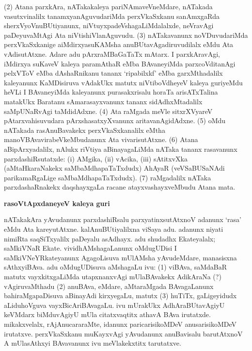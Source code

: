 (2) Atana parxkAra, nATakakaleya pariNAmaveVneMdare, nATakada vasutxvinalilx tanamxya\-nAguvudariMda perxVkaSxkanu sanAmxgaRda sherxVyoVnuBUtiyanunx, niVtuyxpadeVsha\-gaLiMdalalxde, neVravAgi paDeyuvaMtAgi Ata niVtishiVlanAguvudu. (3) nATakavanunx noVDuvuda\-riMda perxVkaSxkanige aiMdirxyasuKAMsha anuBUtavAgadiruvudilalx eMdu Ata vAdisu\-tAtxne. Adare adu pArxraMBaGaTaTx mAtarx. I parxkAravAgi, iMdirxya suKaveV kaleya paramAthaR eMba BAvaneyiMda parxcoVditanAgi pelxVToV eMba dAshaRnikanu tananx `ripabilxkf' eMba garxMthadalilx kaleyanunx KaMDisiruva vAdakUkx matutx niVtiboVdheyeV kaleya guriyeMdu heVLi I BAvaneyiMda kaleyanunx purasakxrisalu horaTa arisATxTa\-lina matakUkx Baratanu sAmarasayxvanunx tananx sidAdhxMtadalilx saMpUNaRvAgi taMdidAdxne. (4) Ata raMgada meVle sitxrXVyareV pAtarxvahisuvudara pArxshasatxyXvanunx aritavanAgidAdxne. (5) oMdu nATakada rasAnuBavakekx perxVkaSxkanalilx eMtha manoVBAvavirabeVkeMbu\-danunx Ata vivarisutAtxne. (6) Atana aBipArxyadalilx, nAlukx riVtiya aBinayagaLiMda nATaka tananx rasavanunx parxdashiRsutatxde: {\rm(i)} AMgika, {\rm(ii)} vAcika, {\rm(iii)} sAtitxvXka (aMtaHkaraNakekx saMbaMdhapaTaTxdudx) AhAyaR (veVSaBUSaNAdi parikamaRgaLige saMbaMdhapaTaTxdudx). (7) raMgadalilx nATaka parxdashaRnakekx daqshayxgaLa racane atayxvashayxveMbudu Atana mata.

\smallskip
\begin{center}
{\Large\bf rasoVtApxdaneyeV kaleya guri}
\end{center}

nATakakAra yAvudanunx parxdashiRsalu parxyatinxsutAtxnoV adanunx `rasa' eMdu Ata kareyutAtxne. kalAnuBUtiyalilxna viSaya adu. adanunx niyati nimiRta saqSiTxyalilx paDeyalu asAdhayx. adu shudadhx Ekateyalalx; saMkiVNaR Ekate. vividhAMshagaLanunx oMdugUDisi I saMkiVNeYRkateyanunx AgagoLisuva mUlAMsha yAvudeMdare, manasisxna sAthxyiBAva. adu oMdugUDisuva aMshagaLu ivu: (1) viBAva, saMdaBaR matutx vayxkitxgaLiMda utapxnanxvAgi mUlaBAvakekx AdikAraNa (?) vAgiruvaMthadu (2) anuBAva, eMdare, aMtaraMgada BAvagaLanunx bahiraMgapaDisuva aBinayAdi kirxyegaLu, matutx (3) huTiTx, gaLigeyidudx aLiduhoVguva vayxBicAriBAvagaLu. ivu mUrakUkx AdhAraBUtavAgiyU keVMdarx biMduvAgiyU mUla citatxvaqtitx athavA BAva irutatxde. mikakxvelalx, rAjAnucararaMte, idanunx paricarisikoMDeV anusarisikoMDeV irutatxve. perxVkaSxkanu muKayxvAgi yAvudanunx anuBavisalu barutAtxnoV A mUlasAthxyi BAvavanunx ivu meVlakekxtitx tarutatxve.

